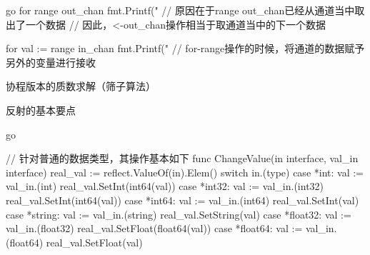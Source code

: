 \begin{outline}[enumerate]
\begin{code-in-enumerate}{go}
for range out_chan {
    fmt.Printf("%
                                   // 原因在于range out_chan已经从通道当中取出了一个数据
                                   // 因此，<-out_chan操作相当于取通道当中的下一个数据
}

for val := range in_chan {
    fmt.Printf("%
                                  // for-range操作的时候，将通道的数据赋予另外的变量进行接收
}
\end{code-in-enumerate}

  \1 协程版本的质数求解（筛子算法）


  \1 反射的基本要点

\begin{code-in-enumerate}{go}

// 针对普通的数据类型，其操作基本如下
func ChangeValue(in interface{}, val_in interface{}) {
    real_val := reflect.ValueOf(in).Elem()
    switch in.(type) {
    case *int:
        val := val_in.(int)
        real_val.SetInt(int64(val))
    case *int32:
        val := val_in.(int32)
        real_val.SetInt(int64(val))
    case *int64:
        val := val_in.(int64)
        real_val.SetInt(val)
    case *string:
        val := val_in.(string)
        real_val.SetString(val)
    case *float32:
        val := val_in.(float32)
        real_val.SetFloat(float64(val))
    case *float64:
        val := val_in.(float64)
        real_val.SetFloat(val)
    }
}


\end{code-in-enumerate}
\end{outline}
